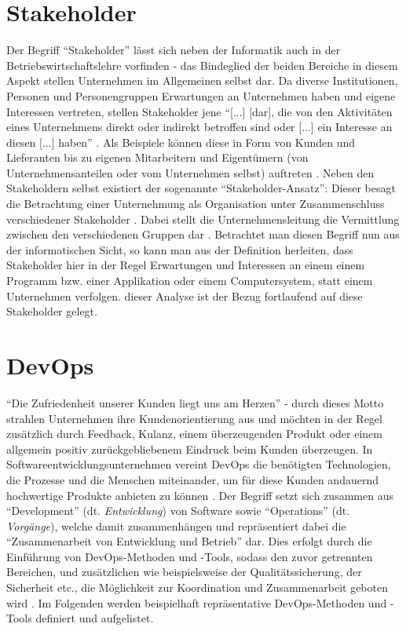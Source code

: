 \section{Stakeholder}
Der Begriff \enquote{Stakeholder} lässt sich neben der Informatik auch in der Betriebswirtschaftslehre vorfinden - das Bindeglied der beiden Bereiche in diesem Aspekt stellen Unternehmen im Allgemeinen selbst dar.
Da diverse Institutionen, Personen und Personengruppen Erwartungen an Unternehmen haben und eigene Interessen vertreten, stellen Stakeholder jene \enquote{[...] [dar], die von den Aktivitäten eines Unternehmens 
direkt oder indirekt betroffen sind oder [...] ein Interesse an diesen [...] haben} \cite{Fleig:2016aa}. Als Beispiele können diese in Form von Kunden und Lieferanten bis zu eigenen Mitarbeitern und Eigentümern (von 
Unternehmensanteilen oder vom Unternehmen selbst) auftreten \cite{Fleig:2016aa}. \newline Neben den Stakeholdern selbst existiert der sogenannte \enquote{Stakeholder-Ansatz}: Dieser besagt die Betrachtung einer Unternehmung
als Organisation unter Zusammenschluss verschiedener Stakeholder \cite{Seyfriedt:2018aa}. Dabei stellt die Unternehmensleitung die Vermittlung zwischen den verschiedenen Gruppen dar \cite{Seyfriedt:2018aa}. \newline
Betrachtet man diesen Begriff nun aus der informatischen Sicht, so kann man aus der Definition herleiten, dass Stakeholder hier in der Regel Erwartungen und Interessen an einem einem Programm bzw. einer Applikation oder einem 
Computersystem, statt einem Unternehmen verfolgen. \newline dieser Analyse ist der Bezug fortlaufend auf diese Stakeholder gelegt.

\section{DevOps}
\enquote{Die Zufriedenheit unserer Kunden liegt uns am Herzen} - durch dieses Motto strahlen Unternehmen ihre Kundenorientierung aus und möchten in der Regel zusätzlich durch Feedback, Kulanz, einem überzeugenden Produkt
oder einem allgemein positiv zurückgebliebenem Eindruck beim Kunden überzeugen. In Softwareentwicklungsunternehmen vereint DevOps die benötigten Technologien, die Prozesse und die Menschen miteinander, um für diese Kunden 
andauernd hochwertige Produkte anbieten zu können \cite{MSAzure:2020aa}. Der Begriff setzt sich zusammen aus \enquote{Development} (dt. \textit{Entwicklung}) von Software sowie \enquote{Operations} (dt. \textit{Vorgänge}), welche damit zusammenhängen 
\cite{MSAzure:2020aa} und repräsentiert dabei die \enquote{Zusammenarbeit von Entwicklung und Betrieb} \cite{Hasselbring:2015aa} dar. Dies erfolgt durch die Einführung von DevOps-Methoden und -Tools, sodass den zuvor getrennten Bereichen, 
und zusätzlichen wie beispielsweise der Qualitätssicherung, der Sicherheit etc., die Möglichkeit zur Koordination und Zusammenarbeit geboten wird \cite{MSAzure:2020aa}. \newline Im Folgenden werden beispielhaft repräsentative DevOps-Methoden und -Tools definiert und aufgelistet.

